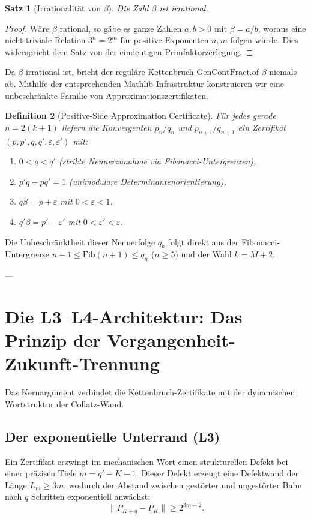 \documentclass[11pt,a4paper]{article}
\newtheorem{theorem}{Satz}[section]
\newtheorem{definition}[theorem]{Definition}
\theoremstyle{definition}
\begin{document}
	\begin{theorem}[Irrationalität von $\beta$]
		Die Zahl $\beta$ ist irrational.
	\end{theorem}
	\begin{proof}
		Wäre $\beta$ rational, so gäbe es ganze Zahlen $a, b > 0$ mit $\beta = a/b$, woraus eine nicht-triviale Relation $3^n = 2^m$ für positive Exponenten $n, m$ folgen würde. Dies widerspricht dem Satz von der eindeutigen Primfaktorzerlegung.
	\end{proof}
	
	Da $\beta$ irrational ist, bricht der reguläre Kettenbruch $\text{GenContFract.of } \beta$ niemals ab. Mithilfe der entsprechenden Mathlib-Infrastruktur konstruieren wir eine unbeschränkte Familie von Approximationszertifikaten.
	
	\begin{definition}[Positive-Side Approximation Certificate]
		Für jedes gerade $n = 2(k+1)$ liefern die Konvergenten $p_n/q_n$ und $p_{n+1}/q_{n+1}$ ein Zertifikat $(p, p', q, q', \varepsilon, \varepsilon')$ mit:
		\begin{enumerate}
			\item $0 < q < q'$ (strikte Nennerzunahme via Fibonacci-Untergrenzen),
			\item $p'q - pq' = 1$ (unimodulare Determinantenorientierung),
			\item $q\beta = p + \varepsilon$ mit $0 < \varepsilon < 1$,
			\item $q'\beta = p' - \varepsilon'$ mit $0 < \varepsilon' < \varepsilon$.
		\end{enumerate}
	\end{definition}
	
	Die Unbeschränktheit dieser Nennerfolge $q_k$ folgt direkt aus der Fibonacci-Untergrenze $n+1 \le \text{Fib}(n+1) \le q_n$ ($n \ge 5$) und der Wahl $k = M+2$.
	
	---
	
	\section{Die L3–L4-Architektur: Das Prinzip der Vergangenheit-Zukunft-Trennung}
	
	Das Kernargument verbindet die Kettenbruch-Zertifikate mit der dynamischen Wortstruktur der Collatz-Wand.
	
	\subsection{Der exponentielle Unterrand (L3)}
	Ein Zertifikat erzwingt im mechanischen Wort einen strukturellen Defekt bei einer präzisen Tiefe $m = q' - K - 1$. Dieser Defekt erzeugt eine Defektwand der Länge $L_m \ge 3m$, wodurch der Abstand zwischen gestörter und ungestörter Bahn nach $q$ Schritten exponentiell anwächst:
	\begin{equation}
		\|P_{K+q} - P_K\| \ge 2^{3m + 2}.
	\end{equation}
	
\end{document}

